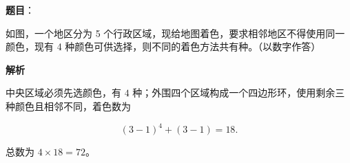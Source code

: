 \begin{answer}

\textbf{题目}：

如图，一个地区分为 5 个行政区域，现给地图着色，要求相邻地区不得使用同一颜色，现有 4 种颜色可供选择，则不同的着色方法共有\gkblank{}种。（以数字作答）
\nopagebreak[4]
\begin{center}\end{center}
\nopagebreak[4]
\textbf{解析}

中央区域必须先选颜色，有 $4$ 种；外围四个区域构成一个四边形环，使用剩余三种颜色且相邻不同，着色数为

\nopagebreak[4]
\[
(3-1)^4+(3-1)=18.
\]

总数为 $4\times18=72$。


\end{answer}

